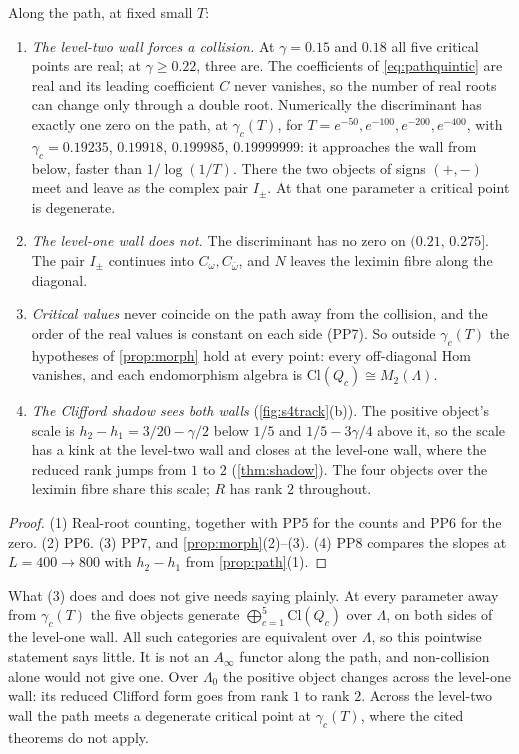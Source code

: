 \documentclass[11pt]{article}
\theoremstyle{definition}\newtheorem{definition}[theorem]{Definition}\newtheorem{remark}[theorem]{Remark}\newtheorem{example}[theorem]{Example}\newtheorem{problem}[theorem]{Open problem}\crefname{problem}{Problem}{Problems}
\begin{document}
\begin{proposition}\label{prop:crossing}
Along the path, at fixed small $T$:
\begin{enumerate}
\item[(1)] \emph{The level-two wall forces a collision.} At $\gamma=0.15$ and $0.18$ all five critical points are real; at $\gamma\ge0.22$, three are. The coefficients of \eqref{eq:pathquintic} are real and its leading coefficient $C$
never vanishes, so the number of real roots can change only through a double root. Numerically the discriminant has exactly one zero on the path, at $\gamma_c(T)$, for $T=e^{-50},e^{-100},e^{-200},e^{-400}$,
with $\gamma_c=0.19235$, $0.19918$, $0.199985$, $0.19999999$: it approaches the wall from below, faster than $1/\log(1/T)$. There the two objects of signs $(+,-)$ meet and leave as the complex pair
$I_\pm$. At that one parameter a critical point is degenerate.
\item[(2)] \emph{The level-one wall does not.} The discriminant has no zero on $(0.21,\,0.275]$. The pair $I_\pm$ continues into $C_\omega,C_{\bar\omega}$, and $N$ leaves the leximin fibre along the diagonal.
\item[(3)] \emph{Critical values} never coincide on the path away from the collision, and the order of the real values is constant on each side (PP7). So outside $\gamma_c(T)$ the hypotheses of
\cref{prop:morph} hold at every point: every off-diagonal Hom vanishes, and each endomorphism algebra is $\mathrm{Cl}(Q_c)\cong M_2(\Lambda)$.
\item[(4)] \emph{The Clifford shadow sees both walls} (\cref{fig:s4track}(b)). The positive object's scale is $h_2-h_1=3/20-\gamma/2$ below $1/5$ and $1/5-3\gamma/4$ above it, so the scale has a kink at the
level-two wall and closes at the level-one wall, where the reduced rank jumps from $1$ to $2$ (\cref{thm:shadow}). The four objects over the leximin fibre share this scale; $R$ has rank $2$
throughout.
\end{enumerate}
\end{proposition}

\begin{proof}
(1) Real-root counting, together with PP5 for the counts and PP6 for the zero. (2) PP6. (3) PP7, and \cref{prop:morph}(2)--(3). (4) PP8 compares the slopes at $L=400\to800$ with $h_2-h_1$ from
\cref{prop:path}(1).
\end{proof}

What (3) does and does not give needs saying plainly. At every parameter away from $\gamma_c(T)$ the five objects generate $\bigoplus_{c=1}^5\mathrm{Cl}(Q_c)$ over $\Lambda$, on both sides of the level-one wall. All
such categories are equivalent over $\Lambda$, so this pointwise statement says little. It is not an $A_\infty$ functor along the path, and non-collision alone would not give one. Over $\Lambda_0$ the
positive object changes across the level-one wall: its reduced Clifford form goes from rank $1$ to rank $2$. Across the level-two wall the path meets a degenerate critical point at $\gamma_c(T)$,
where the cited theorems do not apply.
\end{document}
